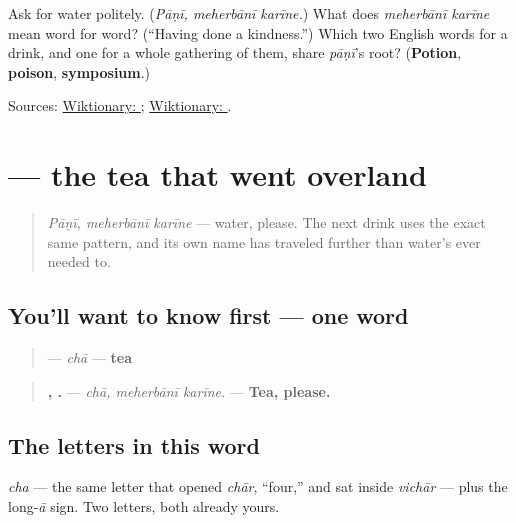 \begin{tcolorbox}[breakable,colback=teal!4,colframe=teal!35!black,title={Before you move on}]
Ask for water politely. (\emph{Pāṇī, meherbānī karīne.}) What does \emph{meherbānī karīne} mean word for word? (\textquotedblleft{}Having done a kindness.\textquotedblright{}) Which two English words for a drink, and one for a whole gathering of them, share \emph{pāṇī}'s root? (\textbf{Potion}, \textbf{poison}, \textbf{symposium}.)

Sources: \href{https://en.wiktionary.org/wiki/\%E0\%AA\%AA\%E0\%AA\%BE\%E0\%AA\%A3\%E0\%AB\%80}{Wiktionary: }; \href{https://en.wiktionary.org/wiki/\%E0\%AA\%AE\%E0\%AA\%B9\%E0\%AB\%87\%E0\%AA\%B0\%E0\%AA\%AC\%E0\%AA\%BE\%E0\%AA\%A8\%E0\%AB\%80}{Wiktionary: }.
\end{tcolorbox}
\section[\texorpdfstring{\gu{ચા} (chā)}{ચા (chā)}]{ — the tea that went overland}

\label{lesson:GU-C10-chaa}



\begin{quote}
\emph{Pāṇī, meherbānī karīne} — water, please. The next drink uses the exact same pattern, and its own name has traveled further than water's ever needed to.
\end{quote}

\subsection*{You'll want to know first — one word}
\begin{quote}
\textbf{} — \emph{chā} — \textbf{tea}
\end{quote}

\begin{quote}
\textbf{,  .} — \emph{chā, meherbānī karīne.} — \textbf{Tea, please.}
\end{quote}

\subsection*{The letters in this word}
\textbf{} \emph{cha} — the same letter that opened \emph{chār}, \textquotedblleft{}four,\textquotedblright{} and sat inside \emph{vichār} — plus the long-\emph{ā} sign. Two letters, both already yours.

